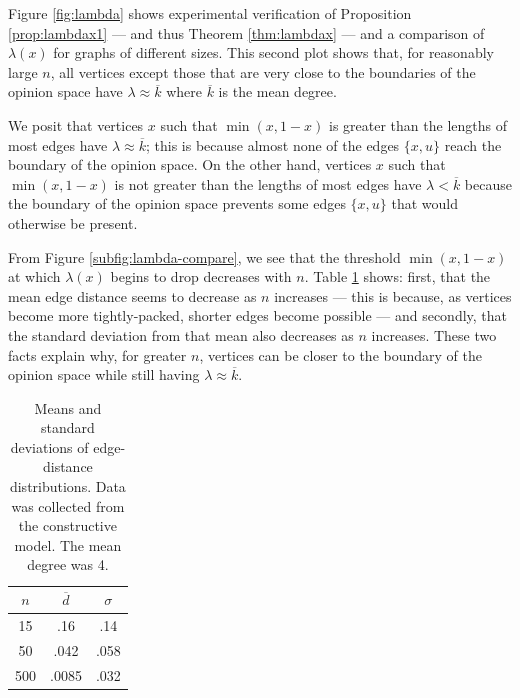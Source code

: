 \documentclass[a4paper,10pt]{article}
\begin{document}
Figure \ref{fig:lambda} shows experimental verification of Proposition \ref{prop:lambdax1} --- and thus Theorem \ref{thm:lambdax} --- and a comparison of $\lambda(x)$ for graphs of different sizes. This second plot shows that, for reasonably large $n$, all vertices except those that are very close to the boundaries of the opinion space have $\lambda \approx \overline{k}$ where $\overline{k}$ is the mean degree. 

We posit that vertices $x$ such that $\min(x, 1 - x)$ is greater than the lengths of most edges have $\lambda \approx \overline{k}$; this is because almost none of the edges $\{x, u\}$ reach the boundary of the opinion space. On the other hand, vertices $x$ such that $\min(x, 1 - x)$ is not greater than the lengths of most edges have $\lambda < \overline{k}$ because the boundary of the opinion space prevents some edges $\{x, u\}$ that would otherwise be present. 

From Figure \ref{subfig:lambda-compare}, we see that the threshold $\min(x, 1 - x)$ at which $\lambda(x)$ begins to drop decreases with $n$. Table \ref{tbl:dist-distro} shows: first, that the mean edge distance seems to decrease as $n$ increases --- this is because, as vertices become more tightly-packed, shorter edges become possible --- and secondly, that the standard deviation from that mean also decreases as $n$ increases. These two facts explain why, for greater $n$, vertices can be closer to the boundary of the opinion space while still having $\lambda \approx \overline{k}.$

\begin{table}
\centering
\begin{tabular}{ c | c | c }
  $n$ & $\overline{d}$ & $\sigma$ \\ \hline
  15 & .16 & .14 \\
  50 & .042 & .058 \\
  500 & .0085 & .032 \\
\end{tabular}
\caption{Means and standard deviations of edge-distance distributions. Data was collected from the constructive model. The mean degree was 4.}
\label{tbl:dist-distro}
\end{table}
\end{document}
